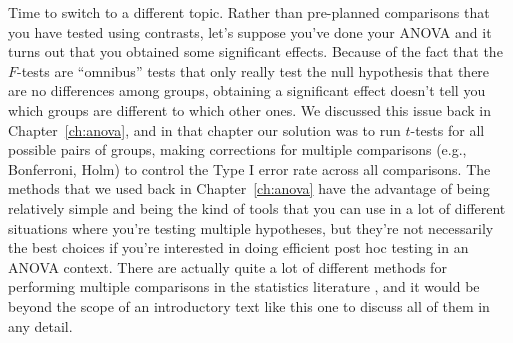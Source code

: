 Time to switch to a different topic. Rather than pre-planned comparisons that you have tested using contrasts, let's suppose you've done your ANOVA and it turns out that you obtained some significant effects. Because of the fact that the $F$-tests are ``omnibus'' tests that only really test the null hypothesis that there are no differences among groups, obtaining a significant effect doesn't tell you which groups are different to which other ones. We discussed this issue back in Chapter~\ref{ch:anova}, and in that chapter our solution was to run $t$-tests for all possible pairs of groups, making  corrections for multiple comparisons (e.g., Bonferroni, Holm) to control the Type I error rate across all comparisons. The methods that we used back in Chapter~\ref{ch:anova} have the advantage of being relatively simple and being the kind of tools that you can use in a lot of different situations where you're testing multiple hypotheses, but they're not necessarily the best choices if you're interested in doing efficient post hoc testing in an ANOVA context. There are actually quite a lot of different methods for performing multiple comparisons in the statistics literature \parencite{Hsu1996}, and it would be beyond the scope of an introductory text like this one to discuss all of them in any detail. 

